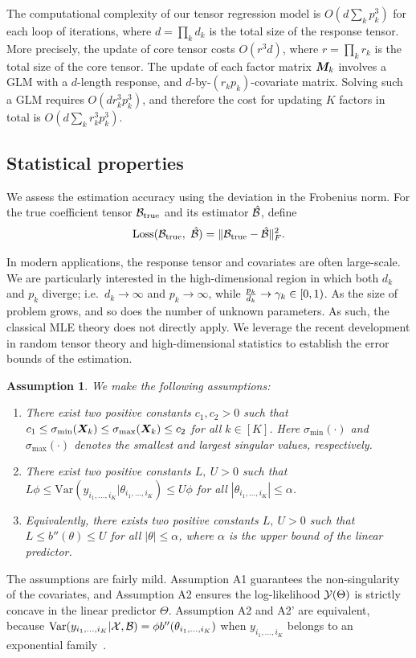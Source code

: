 \documentclass[12pt]{article}
\theoremstyle{plain}
\newtheorem{assumption}{Assumption}
\theoremstyle{definition}
\begin{document}
The computational complexity of our tensor regression model is $O\left(d \sum_k p^3_k\right)$ for each loop of iterations, where $d=\prod_k d_k$ is the total size of the response tensor. More precisely, the update of core tensor costs $O(r^3d)$, where $r=\prod_k r_k$ is the total size of the core tensor. The update of each factor matrix $\bm M_k$ involves a GLM with a $d$-length response, and $d$-by-$(r_kp_k)$-covariate matrix. Solving such a GLM requires $O(dr^3_kp^3_k)$, and therefore the cost for updating $K$ factors in total is $O( d\sum_k r^3_k p_k^3)$.



\subsection{Statistical properties}\label{subsec:statprob}
We assess the estimation accuracy using the deviation in the Frobenius norm. For the true coefficient tensor $\mathcal{B}_{\text{true}}$ and its estimator $\hat {\mathcal{B}}$, define
\[
\text{Loss}(\mathcal{B}_{\text{true}},\ \hat {\mathcal{B}})=\lVert\mathcal{B}_{\text{true}}- \hat {\mathcal{B}}\rVert_F^2.
\]

In modern applications, the response tensor and covariates are often large-scale. We are particularly interested in the high-dimensional region in which both $d_k$ and $p_k$ diverge; i.e.\ $d_k\to \infty$ and $p_k\to\infty$, while ${p_k\over d_k} \to \gamma_k \in[0,1)$. As the size of problem grows, and so does the number of unknown parameters. As such, the classical MLE theory does not directly apply. We leverage the recent development in random tensor theory and high-dimensional statistics to establish the error bounds of the estimation. 

  
  
\begin{assumption}\label{ass}We make the following assumptions:
\begin{enumerate}
\item [A1.] There exist two positive constants $c_1, c_2>0$ such that $c_1\leq \sigma_{\min}(\bm X_k)\leq  \sigma_{\max}(\bm X_k)\leq c_2$ for all $k\in[K]$. Here $\sigma_{\text{min}}(\cdot)$ and $\sigma_{\text{max}}(\cdot)$ denotes the smallest and largest singular values, respectively.
\item [A2.] There exist two positive constants $L,\ U>0$ such that $L\phi \leq \text{Var}(y_{i_1,\ldots,i_K}|\theta_{i_1,\ldots,i_K})\leq U\phi $ for all $|\theta_{i_1,\ldots,i_K}|\leq \alpha$.
\item[A2'.] Equivalently, there exists two positive constants $L,\ U>0$ such that $L\leq b''(\theta) \leq U$ for all $|\theta|\leq \alpha$, where $\alpha$ is the upper bound of the linear predictor. 

\end{enumerate}
\end{assumption}
The assumptions are fairly mild. Assumption A1 guarantees the non-singularity of the covariates, and Assumption A2 ensures the log-likelihood $\mathcal{Y}(\Theta)$ is strictly concave in the linear predictor $\Theta$. Assumption A2 and A2' are equivalent, because $\text{Var}(y_{i_1,\ldots,i_K}|\mathcal{X},\mathcal{B})=\phi b''(\theta_{i_1,\ldots,i_K})$ when $y_{i_1,\ldots,i_K}$ belongs to an exponential family~\citep{mccullagh1989generalized}. 
\end{document}
